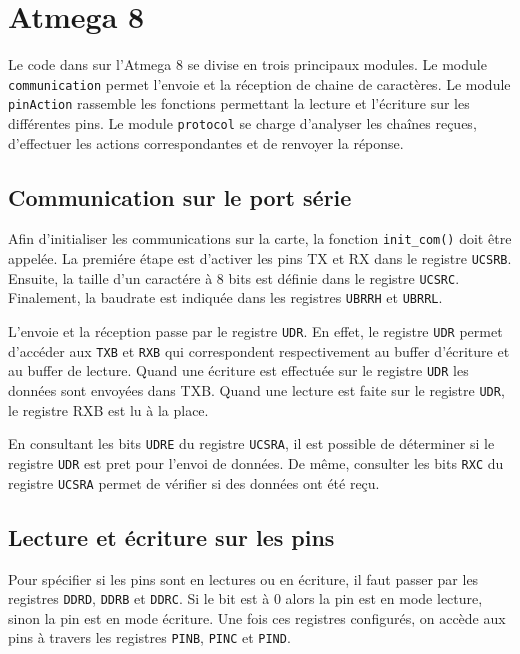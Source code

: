 \section{Atmega 8}
Le code dans sur l'Atmega 8 se divise en trois principaux modules.
Le module \texttt{communication} permet l'envoie et la réception de chaine de caractères.
Le module \texttt{pinAction} rassemble les fonctions permettant la lecture et l'écriture sur les différentes pins.
Le module \texttt{protocol} se charge d'analyser les chaînes reçues, d'effectuer les actions correspondantes et de renvoyer la réponse.

\subsection{Communication sur le port série}
Afin d'initialiser les communications sur la carte, la fonction \texttt{init\_com()} doit être appelée.
La premiére étape est d'activer les pins TX et RX dans le registre \texttt{UCSRB}.
Ensuite, la taille d'un caractére à 8 bits est définie dans le registre \texttt{UCSRC}.
Finalement, la baudrate est indiquée dans les registres \texttt{UBRRH} et \texttt{UBRRL}.

L'envoie et la réception passe par le registre \texttt{UDR}.
En effet, le registre \texttt{UDR} permet d'accéder aux \texttt{TXB} et \texttt{RXB} qui correspondent respectivement au buffer d'écriture et au buffer de lecture.
Quand une écriture est effectuée sur le registre \texttt{UDR} les données sont envoyées dans TXB.
Quand une lecture est faite sur le registre \texttt{UDR}, le registre RXB est lu à la place.

En consultant les bits \texttt{UDRE} du registre \texttt{UCSRA}, il est possible de déterminer si le registre \texttt{UDR} est pret pour l'envoi de données.
De même, consulter les bits \texttt{RXC} du registre \texttt{UCSRA} permet de vérifier si des données ont été reçu.




\subsection{Lecture et écriture sur les pins}
Pour spécifier si les pins sont en lectures ou en écriture, il faut passer par les registres \texttt{DDRD}, \texttt{DDRB} et \texttt{DDRC}.
Si le bit est à 0 alors la pin est en mode lecture, sinon la pin est en mode écriture.
Une fois ces registres configurés, on accède aux pins à travers les registres \texttt{PINB}, \texttt{PINC} et \texttt{PIND}.


